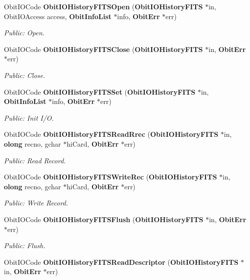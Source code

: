\begin{CompactItemize}
Obit\-IOCode {\bf Obit\-IOHistory\-FITSOpen} ({\bf Obit\-IOHistory\-FITS} $\ast$in, Obit\-IOAccess access, {\bf Obit\-Info\-List} $\ast$info, {\bf Obit\-Err} $\ast$err)
\begin{CompactList}\small\item\em Public: Open. \item\end{CompactList}\item 
Obit\-IOCode {\bf Obit\-IOHistory\-FITSClose} ({\bf Obit\-IOHistory\-FITS} $\ast$in, {\bf Obit\-Err} $\ast$err)
\begin{CompactList}\small\item\em Public: Close. \item\end{CompactList}\item 
Obit\-IOCode {\bf Obit\-IOHistory\-FITSSet} ({\bf Obit\-IOHistory\-FITS} $\ast$in, {\bf Obit\-Info\-List} $\ast$info, {\bf Obit\-Err} $\ast$err)
\begin{CompactList}\small\item\em Public: Init I/O. \item\end{CompactList}\item 
Obit\-IOCode {\bf Obit\-IOHistory\-FITSRead\-Rrec} ({\bf Obit\-IOHistory\-FITS} $\ast$in, {\bf olong} recno, gchar $\ast$hi\-Card, {\bf Obit\-Err} $\ast$err)
\begin{CompactList}\small\item\em Public: Read Record. \item\end{CompactList}\item 
Obit\-IOCode {\bf Obit\-IOHistory\-FITSWrite\-Rec} ({\bf Obit\-IOHistory\-FITS} $\ast$in, {\bf olong} recno, gchar $\ast$hi\-Card, {\bf Obit\-Err} $\ast$err)
\begin{CompactList}\small\item\em Public: Write Record. \item\end{CompactList}\item 
Obit\-IOCode {\bf Obit\-IOHistory\-FITSFlush} ({\bf Obit\-IOHistory\-FITS} $\ast$in, {\bf Obit\-Err} $\ast$err)
\begin{CompactList}\small\item\em Public: Flush. \item\end{CompactList}\item 
Obit\-IOCode {\bf Obit\-IOHistory\-FITSRead\-Descriptor} ({\bf Obit\-IOHistory\-FITS} $\ast$in, {\bf Obit\-Err} $\ast$err)

\end{CompactItemize}
